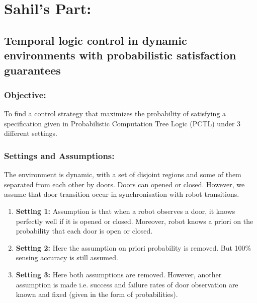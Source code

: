 \documentclass{article}
\theoremstyle{definition}
\begin{document}
\section{Sahil's Part:}
\subsection{Temporal logic control in dynamic environments with probabilistic satisfaction guarantees}
\subsubsection{Objective:}
To find a control strategy that maximizes the
probability of satisfying a specification given in Probabilistic
Computation Tree Logic (PCTL) under 3 different settings.
\subsubsection{Settings and Assumptions:}
The environment is dynamic, with a set of disjoint regions and some of them separated from each other by doors. Doors can opened or closed.
However, we assume that door transition occur in synchronisation with robot transitions.
\begin{enumerate}
    \item \textbf{Setting 1:}
        Assumption is that when a robot observes a door, it knows perfectly well if it is opened or closed. Moreover, robot knows a priori on the probability that each door is open or closed.
    \item \textbf{Setting 2:}
        Here the assumption on priori probability is removed. But 100\% sensing accuracy is still assumed.
    \item \textbf{Setting 3:}
        Here both assumptions are removed. However, another assumption is made i.e. success and failure rates of door observation are known and fixed (given in the form of probabilities).
\end{enumerate}
\end{document}
